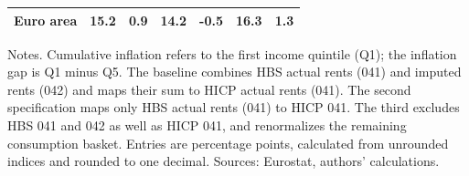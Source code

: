 \begin{table}[H]
\begin{tabular}[t]{lllllll}
\addlinespace
\midrule
\textbf{Euro area} & \textbf{15.2} & \textbf{0.9} & \textbf{14.2} & \textbf{-0.5} & \textbf{16.3} & \textbf{1.3}\\
\bottomrule
\end{tabular}
\vspace{-0.4em}
\begin{flushleft}
\footnotesize{Notes. Cumulative inflation refers to the first income quintile (Q1); the inflation gap is Q1 minus Q5. The baseline combines HBS actual rents (041) and imputed rents (042) and maps their sum to HICP actual rents (041). The second specification maps only HBS actual rents (041) to HICP 041. The third excludes HBS 041 and 042 as well as HICP 041, and renormalizes the remaining consumption basket. Entries are percentage points, calculated from unrounded indices and rounded to one decimal. Sources: Eurostat, authors' calculations.}
\end{flushleft}
\end{table}
